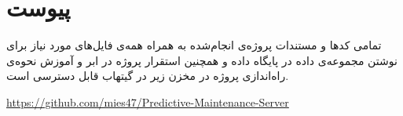 \chapter*{‌پیوست}

تمامی کدها و مستندات پروژه‌ی انجام‌شده به همراه همه‌ی فایل‌های مورد نیاز برای نوشتن مجموعه‌ی داده در پایگاه داده و همچنین استقرار پروژه در ابر و آموزش نحوه‌ی راه‌اندازی پروژه در مخزن زیر در گیتهاب قابل دسترسی است.

\begin{latin}

\href{https://github.com/mies47/Predictive-Maintenance-Server}{https://github.com/mies47/Predictive-Maintenance-Server}

\end{latin}